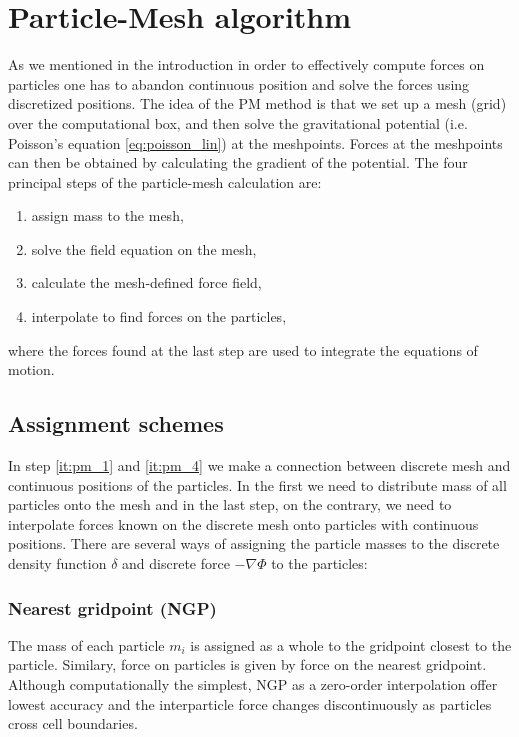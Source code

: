 \section{Particle-Mesh algorithm}
As we mentioned in the introduction in order to effectively compute forces on particles one has to abandon continuous position and solve the forces using discretized positions. The idea of the PM method is that we set up a mesh (grid) over the computational box, and then solve the gravitational potential (i.e. Poisson’s equation \eqref{eq:poisson_lin}) at the meshpoints. Forces at the meshpoints can then be obtained by calculating the gradient of the potential. The four principal steps of the particle-mesh calculation are:
\begin{enumerate}
    \item assign mass to the mesh,
    \label{it:pm_1}
    \item solve the field equation on the mesh,
    \label{it:pm_2}
    \item calculate the mesh-defined force field,
    \label{it:pm_3}
    \item interpolate to find forces on the particles,
    \label{it:pm_4}
\end{enumerate}
where the forces found at the last step are used to integrate the equations of motion.
\subsection{Assignment schemes}
In step \ref{it:pm_1} and \ref{it:pm_4} we make a connection between discrete mesh and continuous positions of the particles. In the first we need to distribute mass of all particles onto the mesh and in the last step, on the contrary, we need to interpolate forces known on the discrete mesh onto particles with continuous positions. There are several ways of assigning the particle masses to the discrete density function $\delta$ and discrete force $-\nabla\Phi$ to the particles:

\subsubsection{Nearest gridpoint (NGP)}
The mass of each particle $m_i$ is assigned as a whole to the gridpoint closest to the particle. Similary, force on particles is given by force on the nearest gridpoint. Although computationally the simplest, NGP as a zero-order interpolation offer lowest accuracy and the interparticle force changes discontinuously as particles cross cell boundaries.

